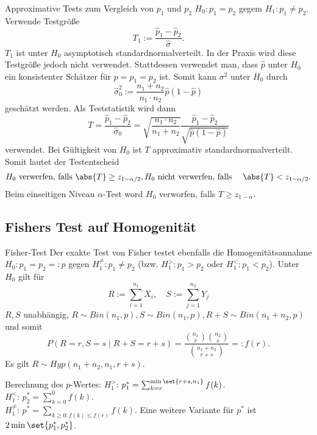 \begin{karte}{Approximative Tests zum Vergleich von \(p_1\) und \(p_2\)}
\(H_0: p_1 = p_2\) gegem \(H_1: p_1 \neq p_2\).
Verwende Testgröße 
\[ T_1 := \frac{\hat{p}_1 - \hat{p}_2}{\hat{\sigma}}. \]
\(T_1\) ist unter \(H_0\) asymptotisch standardnormalverteilt. In der Praxis wird diese Testgröße jedoch nicht verwendet. 
Stattdessen verwendet man, dass \(\hat{p}\) unter \(H_0\) ein konsistenter Schätzer für \(p = p_1 = p_2\) ist.
Somit kann \(\sigma^2\) unter \(H_0\) durch 
\[ \hat{\sigma}_0^2 := \frac{n_1 + n_2}{n_1 \cdot n_2} \hat{p}(1-\hat{p}) \]
geschätzt werden. 
Als Teststatistik wird dann 
\[ T = \frac{\hat{p}_1 - \hat{p}_2}{\hat{\sigma}_0} = \sqrt{ \frac{n_1 \cdot n_2}{n_1 + n_2} } \frac{\hat{p}_1 - \hat{p}_2}{\sqrt{\hat{p}(1-\hat{p})}} \]
verwendet. Bei Gültigkeit von \(H_0\) ist \(T\) approximativ standardnormalverteilt. 
Somit lautet der Testentscheid 
\begin{align*}
    H_0 \text{ verwerfen, falls } &\abs{T} \geq z_{1-\alpha/2}, 
    H_0 \text{ nicht verwerfen, falls } & \abs{T} < z_{1-\alpha/2}.
\end{align*}
Beim einseitigen Niveau \(\alpha\)-Test word \(H_0\) verworfen, falls \(T \geq z_{1-\alpha}\).
\end{karte}

\subsection{Fishers Test auf Homogenität}

\begin{karte}{Fisher-Test}
Der exakte Test von Fisher testet ebenfalls die Homogenitätsannahme \(H_0: p_1 = p_2 =: p\) gegen 
\(H_1^{\neq}: p_1 \neq p_2\) (bzw. \(H_1^>: p_1 > p_2\) oder \(H_1^<: p_1 < p_2\)). Unter \(H_0\) gilt für 
\[ R := \sum_{i=1}^{n_1} X_i, \quad S := \sum_{j=1}^{n_2} Y_j \]
\(R,S\) unabhängig, \(R \sim Bin(n_1, p), S \sim Bin(n_1, p), R+S \sim Bin(n_1+n_2, p)\)
und somit 
\[ P(R=r, S=s \;|\; R+S=r+s) = \frac{ \binom{n_1}{r} \binom{n_2}{s} }{ \binom{n_1+n_2}{r+s} } =: f(r). \]
Es gilt \(R \sim Hyp(n_1 + n_2, n_1, r+s)\).

Berechnung des \(p\)-Wertes: 
\(H_1^>\): \(p_1^* = \sum_{k=r}^{\min\set{r+s, n_1}} f(k)\).\\
\(H_1^<\): \(p_2^* = \sum_{k=0}^{0} f(k)\).\\
\(H_1^\neq\): \(p^* = \sum_{k\geq 0: f(k) \leq f(r)} f(k)\).
Eine weitere Variante für \(p^*\) ist \(2\min\set{p_1^*, p_2^*}\).
\end{karte}

